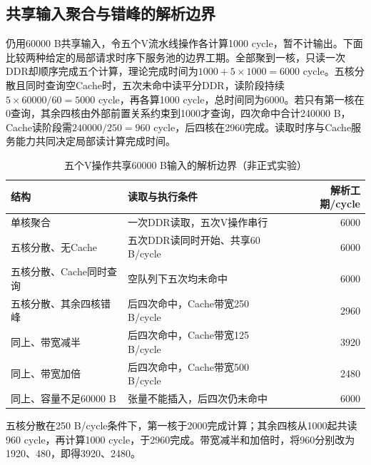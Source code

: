\subsection{共享输入聚合与错峰的解析边界}
仍用60000 B共享输入，令五个V流水线操作各计算1000 cycle，暂不计输出。下面比较两种给定的局部请求时序下服务池的边界工期。全部聚到一核，只读一次DDR却顺序完成五个计算，理论完成时间为$1000+5\times1000=6000$ cycle。五核分散且同时查询空Cache时，五次未命中读平分DDR，读阶段持续$5\times60000/60=5000$ cycle，再各算1000 cycle，总时间同为6000。若只有第一核在0查询，其余四核由外部前置关系约束到1000才查询，四次命中合计240000 B，Cache读阶段需$240000/250=960$ cycle，后四核在2960完成。读取时序与Cache服务能力共同决定局部读计算完成时间。
\begin{table}[H]\centering\caption{五个V操作共享60000 B输入的解析边界（非正式实验）}\label{tab:c-five-example}
\begin{tabularx}{\linewidth}{lYr}\toprule
结构 & 读取与执行条件 & 解析工期/cycle\\\midrule
单核聚合 & 一次DDR读取，五次V操作串行 & 6000\\
五核分散、无Cache & 五次DDR读同时开始、共享60 B/cycle & 6000\\
五核分散、Cache同时查询 & 空队列下五次均未命中 & 6000\\
五核分散、其余四核错峰 & 后四次命中，Cache带宽250 B/cycle & 2960\\
同上、带宽减半 & 后四次命中，Cache带宽125 B/cycle & 3920\\
同上、带宽加倍 & 后四次命中，Cache带宽500 B/cycle & 2480\\
同上、容量不足60000 B & 张量不能插入，后四次仍未命中 & 6000\\\bottomrule
\end{tabularx}\end{table}
五核分散在250 B/cycle条件下，第一核于2000完成计算；其余四核从1000起共读960 cycle，再计算1000 cycle，于2960完成。带宽减半和加倍时，将960分别改为1920、480，即得3920、2480。

